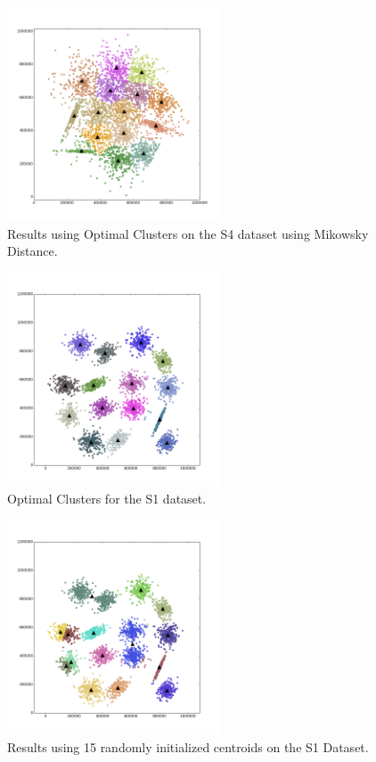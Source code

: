 \documentclass[journal]{IEEEtran}
\begin{document}
\begin{figure}[!t]
	\centering
	\includegraphics[width=2.5in]{../figs/s4_true_mikow_comp_15.png}
	\caption{Results using Optimal Clusters on the S4 dataset using Mikowsky Distance.}
	\label{fig_sim}
\end{figure}

\begin{figure}[!t]
\centering
\includegraphics[width=2.5in]{../figs/s1_true_euclid_15.png}
\caption{Optimal Clusters for the S1 dataset.}
\label{fig_sim}
\end{figure}

\begin{figure}[!t]
	\centering
	\includegraphics[width=2.5in]{../figs/s1_rand_euclid_15.png}
	\caption{Results using 15 randomly initialized centroids on the S1 Dataset.}
	\label{fig_sim}
\end{figure}
\end{document}
